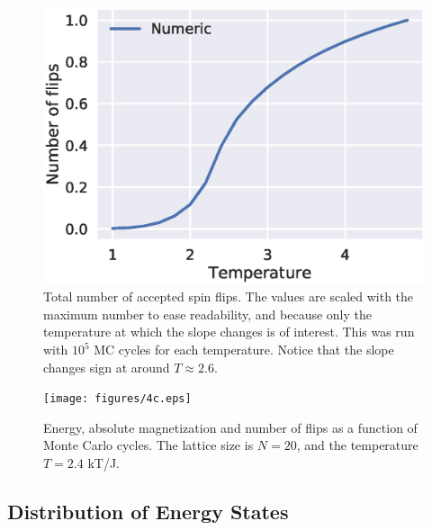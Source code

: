 \documentclass[aps,reprint]{revtex4-1}
\begin{document}
\begin{figure}
  \includegraphics[width=\columnwidth]{figures/4c_number_of_flips.eps}
  \caption{Total number of accepted spin flips. The values are scaled with the
  maximum number to ease readability, and because only the temperature at which the
  slope changes is of interest. This was run with $10^5$ MC
  cycles for each temperature. Notice that the slope changes sign at around
  $T \approx 2.6$.}
  \label{fig:4cFlips}
\end{figure}

\begin{figure}
  \texttt{[image: figures/4c.eps]}
  \caption{Energy, absolute magnetization and number of flips as a function of
  Monte Carlo cycles. The lattice size is $N = 20$, and the temperature $T = 2.4$ kT/J.}
  \label{fig:L20T24Random}
\end{figure}

\subsection{Distribution of Energy States}
\label{sec:distr-energy-stat}
\end{document}
